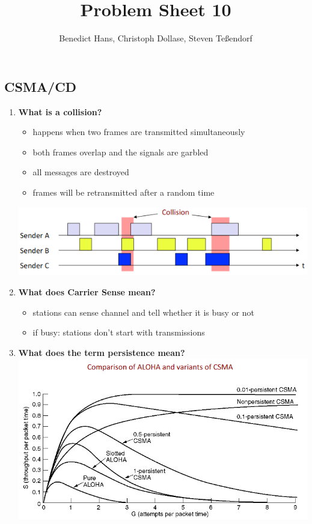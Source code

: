 \documentclass[a4paper,12pt]{article}
\author{Benedict Hans, Christoph Dollase, Steven Te\ss endorf}
\title{ \textbf{Problem Sheet 10}}
\begin{document}
	 
	\maketitle	 %
	
	\subsection{CSMA/CD}
	\begin{enumerate}[label=(\roman*),itemsep=0pt]
		\item \textbf{What is a collision?}
		\begin{itemize}[itemsep=0pt]
			\item  happens when two frames are transmitted simultaneously
			\item  both frames overlap and the signals are garbled
			\item  all messages are destroyed
			\item  frames will be retransmitted after a random time
		\end{itemize}
		\includegraphics[width=0.8\linewidth]{collision.png}
		\item \textbf{What does Carrier Sense mean?}
		\begin{itemize}[itemsep=0pt]
			\item  stations can sense channel and tell whether it is busy or not
			\item  if busy: stations don't start with transmissions
		\end{itemize}
		\item \textbf{What does the term persistence mean?}\\
		\includegraphics[width=0.75\linewidth]{csma.png}

\end{enumerate}
\end{document}

